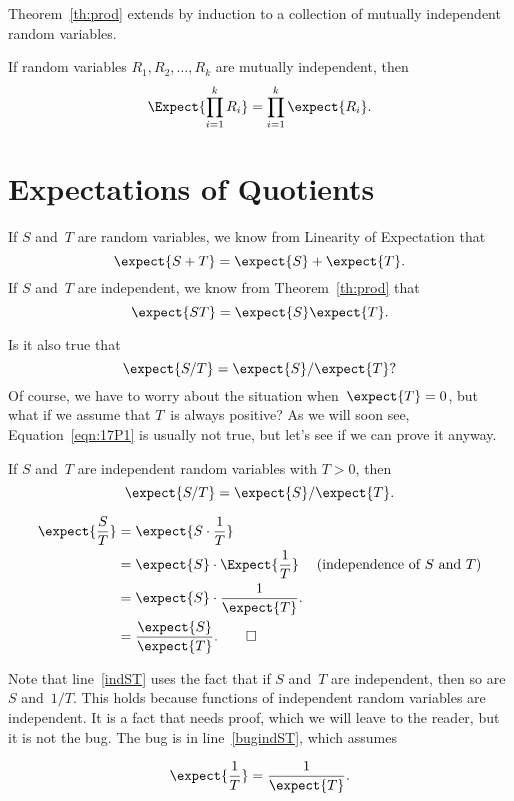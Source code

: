 Theorem~\ref{th:prod} extends by induction to a collection of mutually
independent random variables.
\begin{corollary}
If random variables $R_1, R_2, \dots, R_k$ are mutually
independent, then
\[
    \Expect{\prod_{i=1}^k R_i} = \prod_{i=1}^k \expect{R_i}.
\]
\end{corollary}

\section{Expectations of Quotients}

If $S$ and~$T$ are random variables, we know from Linearity of
Expectation that
\begin{equation*}
    \expect{S + T} = \expect{S} + \expect{T}.
\end{equation*}
If $S$ and~$T$ are independent, we know from Theorem~\ref{th:prod}
that
\begin{equation*}
    \expect{ST} = \expect{S} \expect{T}.
\end{equation*}

Is it also true that
\begin{equation}\label{eqn:17P1}
    \expect{S/T} = \expect{S}/\expect{T}?
\end{equation}
Of course, we have to worry about the situation when~$\expect{T} = 0$,
but what if we assume that $T$~is always positive?  As we will soon
see, Equation~\ref{eqn:17P1} is usually not true, but let's see if we
can prove it anyway.

\begin{falseclm}\label{fc:17P2}
If $S$ and~$T$ are independent random variables with $T > 0$, then
\begin{equation}
    \expect{S/T} = \expect{S}/\expect{T}.
\end{equation}
\end{falseclm}

\begin{bogusproof}
\begin{align}
\expect{\frac{S}{T}} & = \expect{S \cdot \frac{1}{T}} \notag\\
       & = \expect{S} \cdot \Expect{\frac{1}{T}} & \text{(independence of $S$
       and $T$)}\label{indST}\\
      & = \expect{S} \cdot \frac{1}{\expect{T}}. \label{bugindST}\\
      & = \frac{\expect{S}}{\expect{T}}.\notag \qedhere
\end{align}
\end{bogusproof}
Note that line~\ref{indST} uses the fact that if $S$ and~$T$ are
independent, then so are $S$ and~$1/T$.  This holds because functions
of independent random variables are independent.  It is a fact that
needs proof, which we will leave to the reader, but it is not the
bug. The bug is in line~\eqref{bugindST}, which assumes
\begin{falseclm}\label{false-inverse}
\[
\expect{\frac{1}{T}} =  \frac{1}{\expect{T}}.
\]
\end{falseclm}

